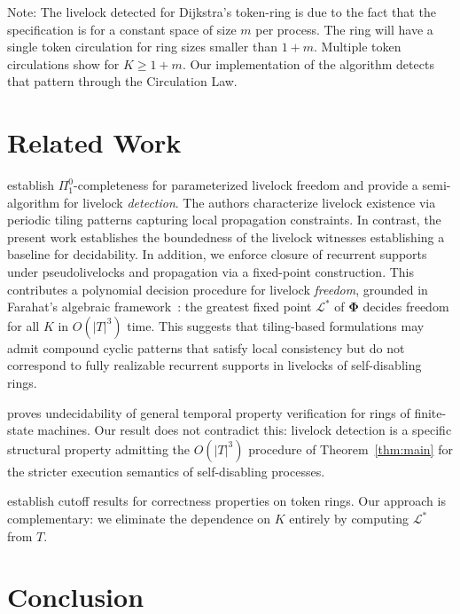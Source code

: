 \documentclass{article}
\newcommand{\Ls}{\mathcal{L}^{*}}
\newcommand{\bPhi}{\boldsymbol{\Phi}}
\begin{document}
Note: The livelock detected for Dijkstra's token-ring is due to the fact that the specification is for a constant space of size $m$ per process. The ring will have a single token circulation for ring sizes smaller than $1 + m$. Multiple token circulations show for $K \geq 1 + m$. Our implementation of the algorithm detects that pattern through the Circulation Law.
\section{Related Work}

\citet{klinkhamer2013,klinkhamer2019} establish $\Pi^0_1$-completeness
for parameterized livelock freedom and provide a semi-algorithm for
livelock \emph{detection}. The authors characterize livelock existence via periodic tiling patterns capturing local propagation constraints. In contrast, the present work establishes the boundedness of the livelock witnesses establishing a baseline for decidability. In addition, we enforce closure of recurrent supports under pseudolivelocks and propagation via a fixed-point construction. This contributes a polynomial decision procedure for livelock \emph{freedom}, grounded in Farahat's
algebraic framework~\citep{farahat2012}: the greatest fixed point $\Ls$
of $\bPhi$ decides freedom for all $K$ in $O(|T|^3)$ time. This suggests that tiling-based formulations may admit compound cyclic patterns that satisfy local consistency but do not correspond to fully realizable recurrent supports in livelocks of self-disabling rings.

\citet{suzuki1988} proves undecidability of general temporal property
verification for rings of finite-state machines. Our result does not
contradict this: livelock detection is a specific structural property
admitting the $O(|T|^3)$ procedure of Theorem~\ref{thm:main} for the stricter execution semantics of self-disabling processes.

\citet{emerson1995} establish cutoff results for correctness properties
on token rings. Our approach is complementary: we eliminate the
dependence on $K$ entirely by computing $\Ls$ from $T$.

\section{Conclusion}
\end{document}
